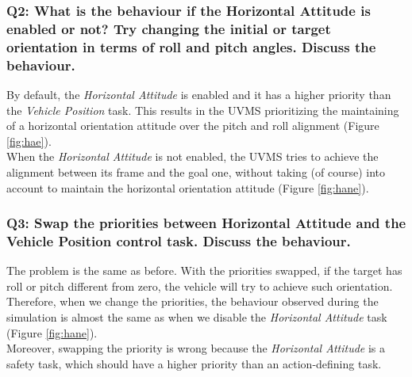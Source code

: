 \documentclass{article}
\begin{document}
\subsubsection{Q2: What is the behaviour if the Horizontal Attitude is enabled or not? Try changing the initial or target orientation in terms of roll and pitch angles. Discuss the behaviour.} 
By default, the \textit{Horizontal Attitude} is enabled and it has a higher priority than the \textit{Vehicle Position} task. 
This results in the UVMS prioritizing the maintaining of a horizontal orientation attitude over the pitch and roll alignment (Figure  \ref{fig:hae}). \\
When the \textit{Horizontal Attitude} is not enabled, the UVMS tries to achieve the alignment between its frame and the goal one, without taking (of course) into account to maintain the horizontal orientation attitude (Figure  \ref{fig:hane}).

\subsubsection{Q3: Swap the priorities between Horizontal Attitude and the Vehicle Position control task. Discuss the behaviour.}
The problem is the same as before. With the priorities swapped, if the target has roll or pitch different from zero, the vehicle will try to achieve such orientation. \\
Therefore, when we change the priorities, the behaviour observed during the simulation is almost the same as when we disable the \textit{Horizontal Attitude} task  (Figure  \ref{fig:hane}).\\
Moreover, swapping the priority is wrong because the \textit{Horizontal Attitude} is a safety task, which should have a higher priority than an action-defining task. 
\clearpage
\end{document}
